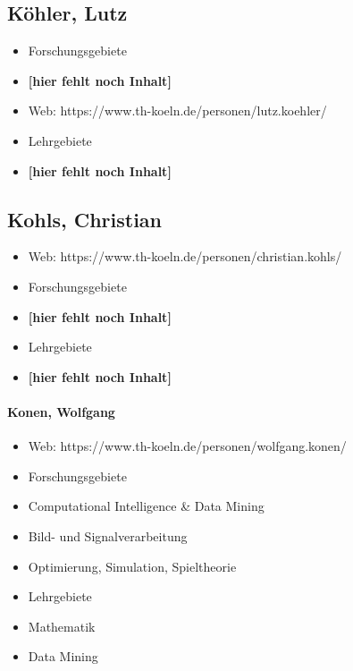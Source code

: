 \subsection{Köhler, Lutz}\label{kuxf6hler-lutz}

\begin{itemize}
\item
  Forschungsgebiete
\item
  \textbf{{[}hier fehlt noch Inhalt{]}}
\item
  Web: https://www.th-koeln.de/personen/lutz.koehler/
\item
  Lehrgebiete
\item
  \textbf{{[}hier fehlt noch Inhalt{]}}
\end{itemize}

\subsection{Kohls, Christian}\label{kohls-christian}

\begin{itemize}
\item
  Web: https://www.th-koeln.de/personen/christian.kohls/
\item
  Forschungsgebiete
\item
  \textbf{{[}hier fehlt noch Inhalt{]}}
\item
  Lehrgebiete
\item
  \textbf{{[}hier fehlt noch Inhalt{]}}
\end{itemize}

\paragraph{Konen, Wolfgang}\label{konen-wolfgang}

\begin{itemize}
\item
  Web: https://www.th-koeln.de/personen/wolfgang.konen/
\item
  Forschungsgebiete
\item
  Computational Intelligence \& Data Mining
\item
  Bild- und Signalverarbeitung
\item
  Optimierung, Simulation, Spieltheorie
\item
  Lehrgebiete
\item
  Mathematik
\item
  Data Mining
\end{itemize}

